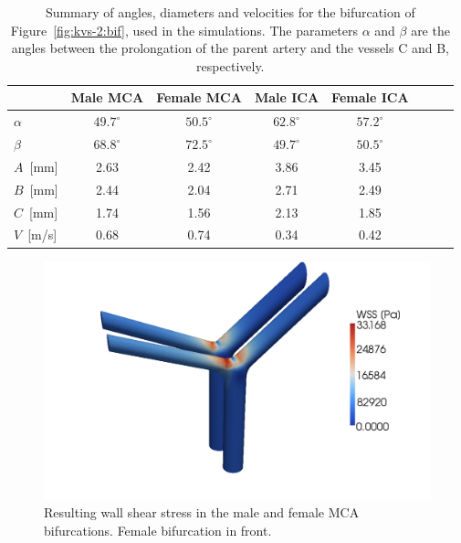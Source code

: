 \begin{table}
  \centering
  \begin{tabular}{l*{6}{c}r}
    \toprule
    & Male MCA & Female MCA & Male ICA & Female ICA \\
    \midrule
    $\alpha$	  & $49.7^\circ$ & $50.5^\circ$   & $62.8^\circ$ & $57.2^\circ$\\
    $\beta$		  & $68.8^\circ$ & $72.5^\circ$   & $49.7^\circ$ & $50.5^\circ$\\
    $A$~[mm]		  & 2.63 & 2.42   & 3.86 & 3.45\\
    $B$~[mm]           & 2.44 & 2.04   & 2.71 & 2.49\\
    $C$~[mm] 	  & 1.74 & 1.56   & 2.13 & 1.85\\
    $V$~[m/s]	  & 0.68   & 0.74     & 0.34   & 0.42  \\
    \bottomrule
  \end{tabular}
  \caption{Summary of angles, diameters and velocities for the
    bifurcation of Figure~\ref{fig:kvs-2:bif}, used in the
    simulations. The parameters $\alpha$ and $\beta$ are the angles
    between the prolongation of the parent artery and the vessels C
    and B, respectively.}
  \label{bcs}
\end{table}

\begin{figure}
\bwfig
  \centering
  \includegraphics[width=\largefig]{chapters/kvs-2/pdf/mcas_wss_II4.pdf}
  \caption{Resulting wall shear stress in the male and female MCA
    bifurcations. Female bifurcation in front.}
  \label{fig:kvs-2:mca_wss_res}
\end{figure}

